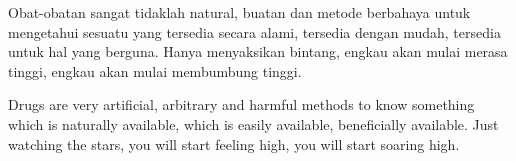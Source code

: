 \bahasa
Obat-obatan sangat tidaklah natural, buatan dan metode berbahaya untuk mengetahui sesuatu yang tersedia secara alami, tersedia dengan mudah, tersedia untuk hal yang berguna. Hanya menyaksikan bintang, engkau akan mulai merasa tinggi, engkau akan mulai membumbung tinggi.

\english
Drugs are very artificial, arbitrary and harmful methods to know something which is naturally available, which is easily available, beneficially available. Just watching the stars, you will start feeling high, you will start soaring high.

